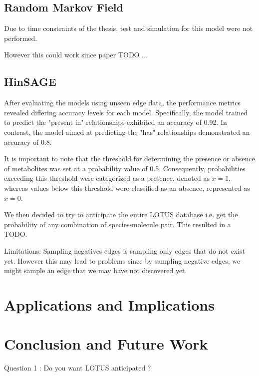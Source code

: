 \documentclass[
11pt, %
oneside, %
english, %
singlespacing, %
headsepline, %
chapterinoneline, %
]{MastersDoctoralThesis} %
\begin{document}
\section{Random Markov Field}
Due to time constraints of the thesis, test and simulation for this model were not performed.

However this could work since paper TODO $\ldots$

\section{HinSAGE}
After evaluating the models using unseen edge data, the performance metrics revealed differing accuracy levels for each model. Specifically, the model trained to predict the "present in" relationships exhibited an accuracy of 0.92. In contrast, the model aimed at predicting the "has" relationships demonstrated an accuracy of 0.8.

It is important to note that the threshold for determining the presence or absence of metabolites was set at a probability value of 0.5. Consequently, probabilities exceeding this threshold were categorized as a presence, denoted as $x=1$, whereas values below this threshold were classified as an absence, represented as $x=0$.










We then decided to try to anticipate the entire LOTUS database i.e. get the probability of any combination of species-molecule pair. This resulted in a TODO. 


Limitations: Sampling negatives edges is sampling only edges that do not exist yet. However this may lead to problems since by sampling negative edges, we might sample an edge that we may have not discovered yet.




\chapter{Applications and Implications}


\chapter{Conclusion and Future Work}
Question 1 : Do you want LOTUS anticipated ? 
\end{document}
